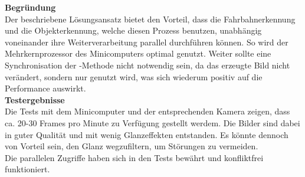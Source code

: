 \textbf{Begründung}\\[0.2cm]
Der beschriebene Lösungsansatz bietet den Vorteil, dass die Fahrbahnerkennung und die Objekterkennung, welche diesen Prozess benutzen, unabhängig voneinander ihre Weiterverarbeitung parallel durchführen können. So wird der Mehrkernprozessor des Minicomputers optimal genutzt. Weiter  sollte eine Synchronisation der -Methode nicht notwendig sein, da das erzeugte Bild nicht verändert, sondern nur genutzt wird, was sich wiederum positiv auf die Performance auswirkt.\\[0.2cm]
\textbf{Testergebnisse}\\[0.2cm]
Die Tests mit dem Minicomputer und der entsprechenden Kamera zeigen, dass ca. 20-30 Frames pro Minute zu Verfügung gestellt werdem. Die Bilder sind dabei in guter Qualität und mit wenig Glanzeffekten entstanden. Es könnte dennoch von Vorteil sein, den Glanz wegzufiltern, um Störungen zu vermeiden.\\
Die parallelen Zugriffe haben sich in den Tests bewährt und konfliktfrei funktioniert.